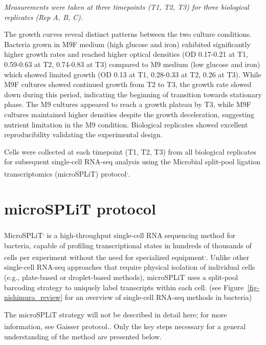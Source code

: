 \documentclass[
  11pt,
  a4paper,
]{report}
\begin{document}
\emph{Measurements were taken at three timepoints (T1, T2, T3) for three
biological replicates (Rep A, B, C).}

The growth curves reveal distinct patterns between the two culture
conditions. Bacteria grown in M9F medium (high glucose and iron)
exhibited significantly higher growth rates and reached higher optical
densities (OD 0.17-0.21 at T1, 0.59-0.63 at T2, 0.74-0.83 at T3)
compared to M9 medium (low glucose and iron) which showed limited growth
(OD 0.13 at T1, 0.28-0.33 at T2, 0.26 at T3). While M9F cultures showed
continued growth from T2 to T3, the growth rate slowed down during this
period, indicating the beginning of transition towards stationary phase.
The M9 cultures appeared to reach a growth plateau by T3, while M9F
cultures maintained higher densities despite the growth deceleration,
suggesting nutrient limitation in the M9 condition. Biological
replicates showed excellent reproducibility validating the experimental
design.

Cells were collected at each timepoint (T1, T2, T3) from all biological
replicates for subsequent single-cell RNA-seq analysis using the
Microbial split-pool ligation transcriptomics (microSPLiT)
protocol\textsuperscript{,}.

\section{microSPLiT protocol}\label{microsplit-protocol}

MicroSPLiT\textsuperscript{,}
is a high-throughput single-cell RNA sequencing method for bacteria,
capable of profiling transcriptional states in hundreds of thousands of
cells per experiment without the need for specialized
equipment\textsuperscript{,}.
Unlike other single-cell RNA-seq approaches that require physical
isolation of individual cells (e.g., plate-based or droplet-based
methods), microSPLiT uses a split-pool barcoding strategy to uniquely
label transcripts within each cell. (see
Figure~\ref{fig-nishimura_review} for an overview of single-cell RNA-seq
methods in bacteria)

\begin{tcolorbox}[enhanced jigsaw, arc=.35mm, colbacktitle=quarto-callout-tip-color!10!white, rightrule=.15mm, title=\textcolor{quarto-callout-tip-color}{\faLightbulb}\hspace{0.5em}{Information}, coltitle=black, bottomrule=.15mm, left=2mm, opacityback=0, colback=white, toprule=.15mm, toptitle=1mm, titlerule=0mm, breakable, bottomtitle=1mm, opacitybacktitle=0.6, colframe=quarto-callout-tip-color-frame, leftrule=.75mm]

The microSPLiT strategy will not be described in detail here; for more
information, see Gaisser
protocol.\textsuperscript{}. Only the key
steps necessary for a general understanding of the method are presented
below.

\end{tcolorbox}
\end{document}
